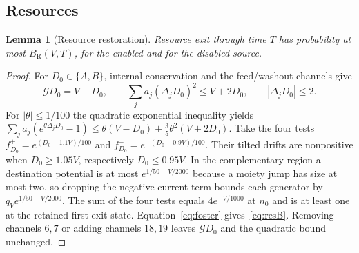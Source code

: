 \documentclass[11pt,a4paper]{article}
\theoremstyle{plain}
\newtheorem{lemma}[theorem]{Lemma}
\theoremstyle{definition}
\theoremstyle{remark}
\newcommand{\G}{\mathcal G}
\newcommand{\BR}{B_{\mathrm R}}
\begin{document}
\subsection{Resources}
\begin{lemma}[Resource restoration]\label{lem:resources}
Resource exit through time $T$ has probability at most $\BR(V,T)$, for the enabled and for the disabled source.
\end{lemma}
\begin{proof}
For $D_0\in\{A,B\}$, internal conservation and the feed/washout channels give
\[
 \G D_0=V-D_0,\qquad\sum_ja_j(\Delta_jD_0)^2\le V+2D_0,\qquad|\Delta_jD_0|\le2.
\]
For $|\theta|\le1/100$ the quadratic exponential inequality yields
$\sum_ja_j(e^{\theta\Delta_jD_0}-1)\le\theta(V-D_0)+\frac35\theta^2(V+2D_0)$.
Take the four tests $f^+_{D_0}=e^{(D_0-1.1V)/100}$ and $f^-_{D_0}=e^{-(D_0-0.9V)/100}$. Their tilted drifts are nonpositive when $D_0\ge1.05V$, respectively $D_0\le0.95V$. In the complementary region a destination potential is at most $e^{1/50-V/2000}$ because a moiety jump has size at most two, so dropping the negative current term bounds each generator by $q_Ve^{1/50-V/2000}$. The sum of the four tests equals $4e^{-V/1000}$ at $n_0$ and is at least one at the retained first exit state. Equation~\eqref{eq:foster} gives~\eqref{eq:resB}. Removing channels $6,7$ or adding channels $18,19$ leaves $\G D_0$ and the quadratic bound unchanged.
\end{proof}
\end{document}
